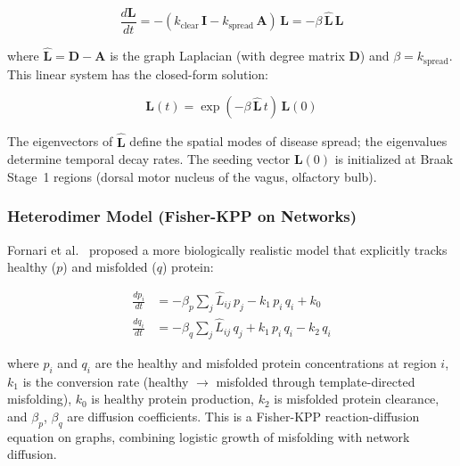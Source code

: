 \begin{equation}
\frac{d\mathbf{L}}{dt} = -(k_\text{clear} \, \mathbf{I} - k_\text{spread} \, \mathbf{A}) \, \mathbf{L} = -\beta \, \mathbf{\hat{L}} \, \mathbf{L}
\label{eq:linear-diffusion}
\end{equation}

where $\mathbf{\hat{L}} = \mathbf{D} - \mathbf{A}$ is the graph Laplacian (with degree matrix $\mathbf{D}$) and $\beta = k_\text{spread}$. This linear system has the closed-form solution:

\begin{equation}
\mathbf{L}(t) = \exp(-\beta \, \mathbf{\hat{L}} \, t) \, \mathbf{L}(0)
\label{eq:diffusion-solution}
\end{equation}

The eigenvectors of $\mathbf{\hat{L}}$ define the spatial modes of disease spread; the eigenvalues determine temporal decay rates. The seeding vector $\mathbf{L}(0)$ is initialized at Braak Stage~1 regions (dorsal motor nucleus of the vagus, olfactory bulb).

\subsubsection{Heterodimer Model (Fisher-KPP on Networks)}

Fornari et al.~\cite{fornari2019} proposed a more biologically realistic model that explicitly tracks healthy ($p$) and misfolded ($q$) protein:

\begin{align}
\frac{dp_i}{dt} &= -\beta_p \sum_j \hat{L}_{ij} \, p_j - k_1 \, p_i \, q_i + k_0 \label{eq:heterodimer-p} \\
\frac{dq_i}{dt} &= -\beta_q \sum_j \hat{L}_{ij} \, q_j + k_1 \, p_i \, q_i - k_2 \, q_i \label{eq:heterodimer-q}
\end{align}

where $p_i$ and $q_i$ are the healthy and misfolded protein concentrations at region $i$, $k_1$ is the conversion rate (healthy $\to$ misfolded through template-directed misfolding), $k_0$ is healthy protein production, $k_2$ is misfolded protein clearance, and $\beta_p$, $\beta_q$ are diffusion coefficients. This is a Fisher-KPP reaction-diffusion equation on graphs, combining logistic growth of misfolding with network diffusion.

